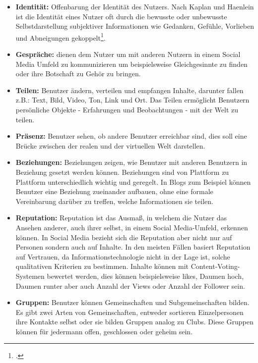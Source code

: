 \begin{itemize}
	\item \textbf{Identität:} Offenbarung der Identität des Nutzers. Nach Kaplan und Haenlein ist die Identität eines Nutzer oft durch die bewusste oder unbewusste Selbstdarstellung subjektiver Informationen wie Gedanken, Gefühle, Vorlieben und Abneigungen gekoppelt\footcite[S.59-68]{kaplan}.
	
	\item \textbf{Gespräche:} dienen dem Nutzer um mit anderen Nutzern in einem Social Media Umfeld zu kommunizieren um beispielsweise Gleichgesinnte zu finden oder ihre Botschaft zu Gehör zu bringen.
	
	\item \textbf{Teilen:} Benutzer ändern, verteilen und empfangen Inhalte, darunter fallen z.B.: Text, Bild, Video, Ton, Link und Ort. Das Teilen ermöglicht Benutzern persönliche Objekte - Erfahrungen und Beobachtungen - mit der Welt zu teilen.
	
	
	\item \textbf{Präsenz:} Benutzer sehen, ob andere Benutzer erreichbar sind, dies soll eine Brücke zwischen der realen und der virtuellen Welt darstellen.
	
	
	\item \textbf{Beziehungen:} Beziehungen zeigen, wie Benutzer mit anderen Benutzern in Beziehung gesetzt werden können. Beziehungen sind von Plattform zu Plattform unterschiedlich wichtig und geregelt. In Blogs zum Beispiel können Benutzer eine Beziehung zueinander aufbauen, ohne eine formale Vereinbarung darüber zu treffen, welche Informationen sie teilen.
	
	
	\item \textbf{Reputation:} Reputation ist das Ausmaß, in welchem die Nutzer das Ansehen anderer, auch ihrer selbst, in einem Social Media-Umfeld, erkennen können. In Social Media bezieht sich die Reputation aber nicht nur auf Personen sondern auch auf Inhalte. In den meisten Fällen basiert Reputation auf Vertrauen, da Informationstechnologie nicht in der Lage ist, solche qualitativen Kriterien zu bestimmen. Inhalte können mit Content-Voting-Systemen bewertet werden, dies können beispielsweise {\glqq likes\grqq}, {\glqq Daumen hoch\grqq}, {\glqq Daumen runter\grqq} aber auch Anzahl der Views oder Anzahl der Follower sein.
	
	
	\item \textbf{Gruppen:} Benutzer können Gemeinschaften und Subgemeinschaften bilden. Es gibt zwei Arten von Gemeinschaften, entweder sortieren Einzelpersonen ihre Kontakte selbst oder sie bilden Gruppen analog zu Clubs. Diese Gruppen können für jedermann offen, geschlossen oder geheim sein.
\end{itemize}

